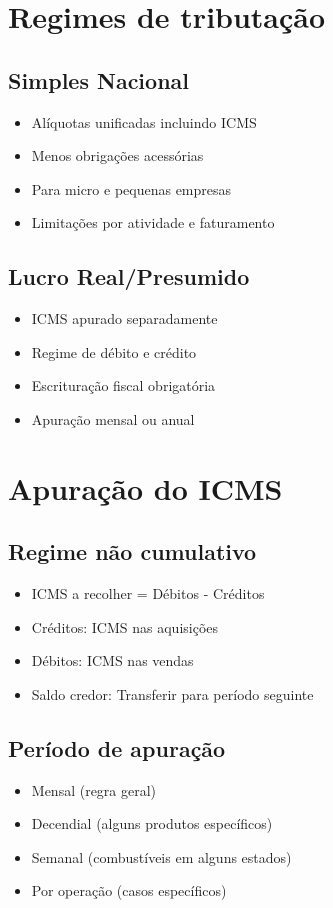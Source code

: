 \documentclass[12pt,a4paper]{article}
\begin{document}
\section{Regimes de tributação}

\subsection{Simples Nacional}
\begin{itemize}
    \item Alíquotas unificadas incluindo ICMS
    \item Menos obrigações acessórias
    \item Para micro e pequenas empresas
    \item Limitações por atividade e faturamento
\end{itemize}

\subsection{Lucro Real/Presumido}
\begin{itemize}
    \item ICMS apurado separadamente
    \item Regime de débito e crédito
    \item Escrituração fiscal obrigatória
    \item Apuração mensal ou anual
\end{itemize}

\section{Apuração do ICMS}

\subsection{Regime não cumulativo}
\begin{itemize}
    \item ICMS a recolher = Débitos - Créditos
    \item Créditos: ICMS nas aquisições
    \item Débitos: ICMS nas vendas
    \item Saldo credor: Transferir para período seguinte
\end{itemize}

\subsection{Período de apuração}
\begin{itemize}
    \item Mensal (regra geral)
    \item Decendial (alguns produtos específicos)
    \item Semanal (combustíveis em alguns estados)
    \item Por operação (casos específicos)
\end{itemize}
\end{document}
